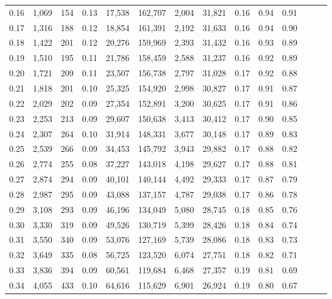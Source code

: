 \begin{tabular}{rrrrrrrrrrrrrr}
0.16 &  1,069 &  154 &  0.13 &   17,538 &  162,707 &   2,004 &  31,821 &  0.16 &  0.94 &      0.91 \\
0.17 &  1,316 &  188 &  0.12 &   18,854 &  161,391 &   2,192 &  31,633 &  0.16 &  0.94 &      0.90 \\
0.18 &  1,422 &  201 &  0.12 &   20,276 &  159,969 &   2,393 &  31,432 &  0.16 &  0.93 &      0.89 \\
0.19 &  1,510 &  195 &  0.11 &   21,786 &  158,459 &   2,588 &  31,237 &  0.16 &  0.92 &      0.89 \\
0.20 &  1,721 &  209 &  0.11 &   23,507 &  156,738 &   2,797 &  31,028 &  0.17 &  0.92 &      0.88 \\
0.21 &  1,818 &  201 &  0.10 &   25,325 &  154,920 &   2,998 &  30,827 &  0.17 &  0.91 &      0.87 \\
0.22 &  2,029 &  202 &  0.09 &   27,354 &  152,891 &   3,200 &  30,625 &  0.17 &  0.91 &      0.86 \\
0.23 &  2,253 &  213 &  0.09 &   29,607 &  150,638 &   3,413 &  30,412 &  0.17 &  0.90 &      0.85 \\
0.24 &  2,307 &  264 &  0.10 &   31,914 &  148,331 &   3,677 &  30,148 &  0.17 &  0.89 &      0.83 \\
0.25 &  2,539 &  266 &  0.09 &   34,453 &  145,792 &   3,943 &  29,882 &  0.17 &  0.88 &      0.82 \\
0.26 &  2,774 &  255 &  0.08 &   37,227 &  143,018 &   4,198 &  29,627 &  0.17 &  0.88 &      0.81 \\
0.27 &  2,874 &  294 &  0.09 &   40,101 &  140,144 &   4,492 &  29,333 &  0.17 &  0.87 &      0.79 \\
0.28 &  2,987 &  295 &  0.09 &   43,088 &  137,157 &   4,787 &  29,038 &  0.17 &  0.86 &      0.78 \\
0.29 &  3,108 &  293 &  0.09 &   46,196 &  134,049 &   5,080 &  28,745 &  0.18 &  0.85 &      0.76 \\
0.30 &  3,330 &  319 &  0.09 &   49,526 &  130,719 &   5,399 &  28,426 &  0.18 &  0.84 &      0.74 \\
0.31 &  3,550 &  340 &  0.09 &   53,076 &  127,169 &   5,739 &  28,086 &  0.18 &  0.83 &      0.73 \\
0.32 &  3,649 &  335 &  0.08 &   56,725 &  123,520 &   6,074 &  27,751 &  0.18 &  0.82 &      0.71 \\
0.33 &  3,836 &  394 &  0.09 &   60,561 &  119,684 &   6,468 &  27,357 &  0.19 &  0.81 &      0.69 \\
0.34 &  4,055 &  433 &  0.10 &   64,616 &  115,629 &   6,901 &  26,924 &  0.19 &  0.80 &      0.67 \\

\end{tabular}
